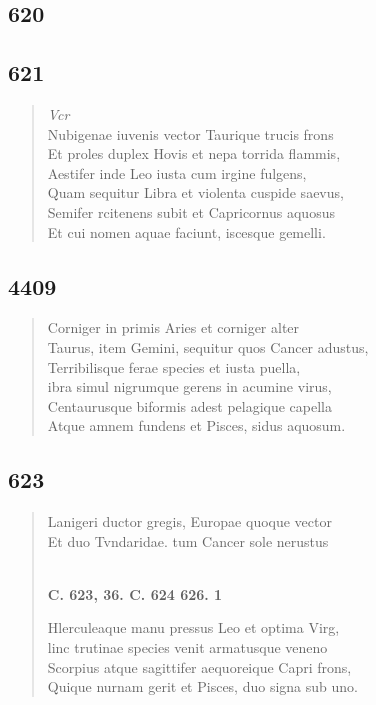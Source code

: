 \documentclass[11pt, a4paper]{report}
\begin{document}
            \subsection*{620}
      \begin{verse}
      \end{verse}
  
            \subsection*{621}
      \begin{verse}
      \textit{Vcr} \\ Nubigenae iuvenis vector Taurique trucis frons \\ Et proles duplex Hovis et nepa torrida flammis, \\ Aestifer inde Leo iusta cum irgine fulgens, \\ Quam sequitur Libra et violenta cuspide saevus, \\ Semifer rcitenens subit et Capricornus aquosus \\ Et cui nomen aquae faciunt, iscesque gemelli. \\ 
      \end{verse}
  
            \subsection*{4409}
      \begin{verse}
      Corniger in primis Aries et corniger alter \\ Taurus, item Gemini, sequitur quos Cancer adustus, \\ Terribilisque ferae species et iusta puella, \\ ibra simul nigrumque gerens in acumine virus, \\ Centaurusque biformis adest pelagique capella \\ Atque amnem fundens et Pisces, sidus aquosum. \\ 
      \end{verse}
  
            \subsection*{623}
      \begin{verse}
      Lanigeri ductor gregis, Europae quoque vector \\ Et duo Tvndaridae. tum Cancer sole nerustus \\ 
        ﻿\pagebreak 
    \begin{center} \textbf{C. 623, 36. C. 624 626. 1} \end{center} \marginpar{[94]} Hlerculeaque manu pressus Leo et optima Virg, \\ linc trutinae species venit armatusque veneno \\ Scorpius atque sagittifer aequoreique Capri frons, \\ Quique nurnam gerit et Pisces, duo signa sub uno. \\ 
      \end{verse}
  
\end{document}
